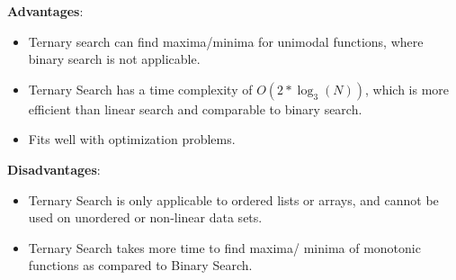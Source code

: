 \begin{table}[h]
    \begin{minipage}[t]{0.48\linewidth}
        \textbf{Advantages}:
        \begin{itemize}
            \item Ternary search can find maxima/minima for unimodal functions, where binary search is not applicable.
            
            \item Ternary Search has a time complexity of $O(2 * \log_3(N))$, which is more efficient than linear search and comparable to binary search.

            \item Fits well with optimization problems.
        \end{itemize}
    \end{minipage}
    \hfill
    \begin{minipage}[t]{0.48\linewidth}
        \textbf{Disadvantages}:
        \begin{itemize}
            \item Ternary Search is only applicable to ordered lists or arrays, and cannot be used on unordered or non-linear data sets.

            \item Ternary Search takes more time to find maxima/ minima of monotonic functions as compared to Binary Search.
        \end{itemize}
    \end{minipage}
\end{table}

